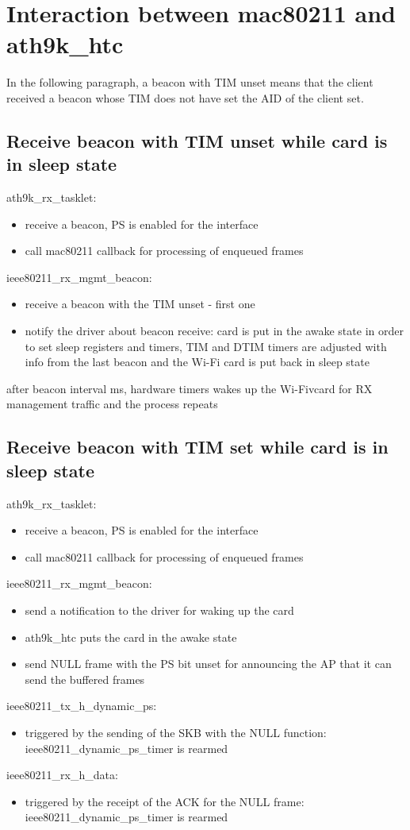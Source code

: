 \section{Interaction between mac80211 and ath9k_htc}
\label{sec:ath9khtcmac80211interction}

In the following paragraph, a beacon with TIM unset means that the client received a beacon whose TIM does not have set the AID of the client set.

\subsection{Receive beacon with TIM unset while card is in sleep state}
\label{sub-sec:analysis-1}
ath9k_rx_tasklet: 
\begin{itemize}
\item receive a beacon, PS is enabled for the interface
\item call mac80211 callback for processing of enqueued frames
\end{itemize}
ieee80211_rx_mgmt_beacon:
\begin{itemize}
\item receive a beacon with the TIM unset - first one
\item notify the driver about beacon receive: card is put in the awake state in order to set sleep registers and timers, TIM and DTIM timers are adjusted with info from the last beacon and the Wi-Fi card is put back in sleep state
\end{itemize}
after beacon interval ms, hardware timers wakes up the Wi-Fivcard for RX management traffic and the process repeats

\subsection{Receive beacon with TIM set while card is in sleep state}
\label{sub-sec:analysis-2}
ath9k_rx_tasklet: 
\begin{itemize}
\item receive a beacon, PS is enabled for the interface
\item call mac80211 callback for processing of enqueued frames
\end{itemize}
ieee80211_rx_mgmt_beacon:
\begin{itemize}
\item send a notification to the driver for waking up the card
\item ath9k_htc puts the card in the awake state
\item send NULL frame with the PS bit unset for announcing the AP that it can send the buffered frames
\end{itemize}
ieee80211_tx_h_dynamic_ps:
\begin{itemize}
\item triggered by the sending of the SKB with the NULL function: ieee80211_dynamic_ps_timer is rearmed
\end{itemize}
ieee80211_rx_h_data:
\begin{itemize}
\item triggered by the receipt of the ACK for the NULL frame: ieee80211_dynamic_ps_timer is rearmed
\end{itemize}

